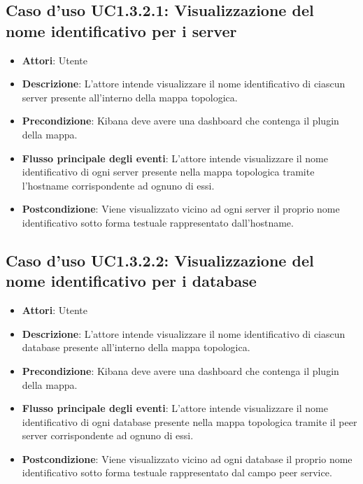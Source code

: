 \subsection{Caso d'uso UC1.3.2.1: Visualizzazione del nome identificativo per i server}
\begin{itemize}
\item \textbf{Attori}: Utente
\item \textbf{Descrizione}: L'attore intende visualizzare il nome identificativo di ciascun server presente all'interno della mappa topologica.
\item \textbf{Precondizione}: Kibana deve avere una dashboard che contenga il plugin della mappa.
\item \textbf{Flusso principale degli eventi}: L'attore intende visualizzare il nome identificativo di ogni server presente nella mappa topologica tramite l'hostname corrispondente ad ognuno di essi.
\item \textbf{Postcondizione}: Viene visualizzato vicino ad ogni server il proprio nome identificativo sotto forma testuale rappresentato dall'hostname.
\end{itemize}
\subsection{Caso d'uso UC1.3.2.2: Visualizzazione del nome identificativo per i database}
\begin{itemize}
\item \textbf{Attori}: Utente
\item \textbf{Descrizione}: L'attore intende visualizzare il nome identificativo di ciascun database presente all'interno della mappa topologica.
\item \textbf{Precondizione}: Kibana deve avere una dashboard che contenga il plugin della mappa.
\item \textbf{Flusso principale degli eventi}: L'attore intende visualizzare il nome identificativo di ogni database presente nella mappa topologica tramite il peer server corrispondente ad ognuno di essi.
\item \textbf{Postcondizione}: Viene visualizzato vicino ad ogni database il proprio nome identificativo sotto forma testuale rappresentato dal campo peer service.
\end{itemize}
